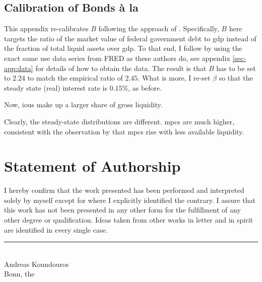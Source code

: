 \documentclass[12pt]{article} %
\numberwithin{equation}{section} %
\numberwithin{figure}{section}
\numberwithin{table}{section}
\begin{document}
\begin{refsection}
\begin{appendices}
\subsection{Calibration of Bonds à la \textcite{bayer2023}}
\label{sec-app:robust-bonds}

This appendix re-calibrates $B$ following the approach of \textcite{bayer2023}. Specifically, $B$ here targets the ratio of the market value of federal government debt to \Gls{gdp} instead of the fraction of total liquid assets over \Gls{gdp}. To that end, I follow \textcite{bayer2023} by using the exact same use data series from FRED as these authors do, see appendix \ref{sec-app:data} for details of how to obtain the data. The result is that $B$ has to be set to $2.24$ to match the empirical ratio of $2.45$. What is more, I re-set $\beta$ so that the steady state (real) interest rate is $0.15\%$, as before.

Now, \Gls{iou}s make up a larger share of gross liquidity. 

Clearly, the steady-state distributions are different. \Gls{mpc}s are much higher, consistent with the observation by \textcite{kaplan2018} that \Gls{mpc}s rise with less available liquidity.

\end{appendices}
\newpage
\thispagestyle{plain}
\renewcommand*{\thepage}{A-\arabic{page}} %
\printbibliography[heading=subbibliography, title={Appendix References}]
\end{refsection}


\newpage
\thispagestyle{plain}
\section*{Statement of Authorship} %
I hereby confirm that the work presented has been performed and interpreted solely by myself except for where I explicitly identified the contrary. I assure that this work has not been presented in any other form for the fulfillment of any other degree or qualification. Ideas taken from other works in letter and in spirit are identified in every single case.

\vspace{2cm}
\noindent
\rule{8cm}{0.4pt}\\
Andreas Koundouros\\
Bonn, the 
\end{document}
